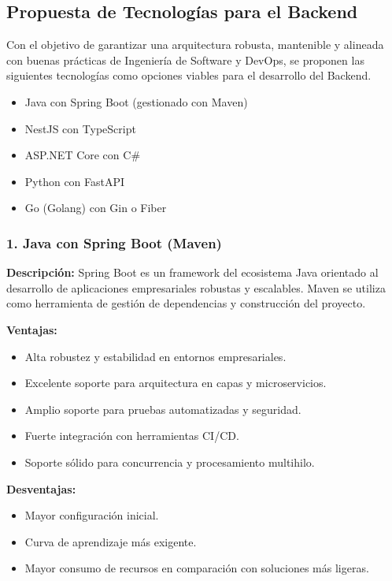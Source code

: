\documentclass[12pt]{article}
\begin{document}
\subsection{Propuesta de Tecnologías para el Backend}

Con el objetivo de garantizar una arquitectura robusta, mantenible y alineada con buenas prácticas de Ingeniería de Software y DevOps, se proponen las siguientes tecnologías como opciones viables para el desarrollo del Backend.

\begin{itemize}
    \item Java con Spring Boot (gestionado con Maven)
    \item NestJS con TypeScript
    \item ASP.NET Core con C#
    \item Python con FastAPI
    \item Go (Golang) con Gin o Fiber
\end{itemize}

\subsubsection{1. Java con Spring Boot (Maven)}

\textbf{Descripción:}  
Spring Boot es un framework del ecosistema Java orientado al desarrollo de aplicaciones empresariales robustas y escalables. Maven se utiliza como herramienta de gestión de dependencias y construcción del proyecto.

\textbf{Ventajas:}
\begin{itemize}
    \item Alta robustez y estabilidad en entornos empresariales.
    \item Excelente soporte para arquitectura en capas y microservicios.
    \item Amplio soporte para pruebas automatizadas y seguridad.
    \item Fuerte integración con herramientas CI/CD.
    \item Soporte sólido para concurrencia y procesamiento multihilo.
\end{itemize}

\textbf{Desventajas:}
\begin{itemize}
    \item Mayor configuración inicial.
    \item Curva de aprendizaje más exigente.
    \item Mayor consumo de recursos en comparación con soluciones más ligeras.
\end{itemize}
\end{document}
